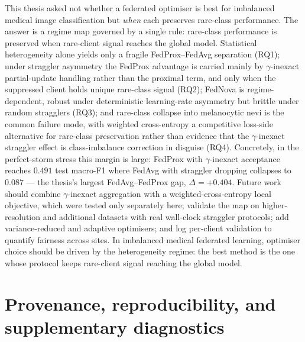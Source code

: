 \documentclass[11pt,a4paper]{report}
\begin{document}
This thesis asked not whether a federated optimiser is best for imbalanced medical
image classification but \emph{when} each preserves rare-class performance. The
answer is a regime map governed by a single rule: rare-class performance is
preserved when rare-client signal reaches the global model. Statistical
heterogeneity alone yields only a fragile FedProx--FedAvg separation (RQ1); under
straggler asymmetry the FedProx advantage is carried mainly by $\gamma$-inexact
partial-update handling rather than the proximal term, and only when the
suppressed client holds unique rare-class signal (RQ2); FedNova is
regime-dependent, robust under deterministic learning-rate asymmetry but brittle
under random stragglers (RQ3); and rare-class collapse into melanocytic nevi is
the common failure mode, with weighted cross-entropy a competitive loss-side
alternative for rare-class preservation rather than evidence that the
$\gamma$-inexact straggler effect is class-imbalance correction in disguise (RQ4). Concretely, in the
perfect-storm stress this margin is large: FedProx with $\gamma$-inexact
acceptance reaches $0.491$ test macro-F1 where FedAvg with straggler dropping
collapses to $0.087$ --- the thesis's largest FedAvg--FedProx gap, $\Delta =
+0.404$. Future work should combine
$\gamma$-inexact aggregation with a weighted-cross-entropy local objective, which
were tested only separately here; validate the map on higher-resolution and
additional datasets with real wall-clock straggler protocols; add variance-reduced
and adaptive optimisers; and log per-client validation to quantify fairness across
sites. In imbalanced medical federated learning, optimiser choice should be driven by the
heterogeneity regime: the best method is the one whose protocol keeps rare-client
signal reaching the global model.






\appendix

\chapter{Provenance, reproducibility, and supplementary diagnostics}
\label{app:repro}
\end{document}
